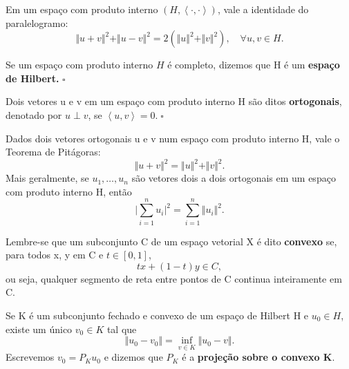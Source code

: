 \documentclass[../functional_analysis.tex]{subfiles}
\begin{document}
\hypertarget{parallelogram_identity}{\begin{lemma*}
		Em um espaço com produto interno \((H, \left< \cdot , \cdot  \right>)\), vale a identidade do paralelogramo:
		\[
			\Vert u + v \Vert^{2} + \Vert u-v \Vert^{2} = 2(\Vert u \Vert^{2} + \Vert v \Vert^{2}),\quad \forall u, v\in H.
		\]
	\end{lemma*}}
\begin{def*}
	Se um espaço com produto interno \(H\) é completo, dizemos que H é um \textbf{espaço de Hilbert.} \(\square\)
\end{def*}
\begin{def*}
	Dois vetores u e v em um espaço com produto interno H são ditos \textbf{ortogonais}, denotado por \(u\perp v\), se \(\left< u, v \right> = 0.\; \square\)
\end{def*}
\hypertarget{pythagorean_theorem}{\begin{theorem*}
		Dados dois vetores ortogonais u e v num espaço com produto interno H, vale o Teorema de Pitágoras:
		\[
			\Vert u + v \Vert^{2} = \Vert u \Vert^{2} + \Vert v \Vert^{2}.
		\]
		Mais geralmente, se \(u_1, \dotsc , u_{n}\) são vetores dois a dois ortogonais em um espaço com produto interno H, então
		\[
			\biggl\vert \sum\limits_{i=1}^{n}u_{i} \biggr\vert^{2} = \sum\limits_{i=1}^{n}\Vert u_{i} \Vert^{2}.
		\]
	\end{theorem*}}
\begin{tcolorbox}[
		skin=enhanced,
		title=Lembrete!,
		after title={\hfill Conjuntos Convexos},
		fonttitle=\bfseries,
		sharp corners=downhill,
		colframe=black,
		colbacktitle=yellow!75!white,
		colback=yellow!30,
		colbacklower=black,
		coltitle=black,
		drop large lifted shadow
	]
	Lembre-se que um subconjunto C de um espaço vetorial X é dito \textbf{convexo} se, para todos x, y em C e \(t\in [0, 1]\),
	\[
		tx + (1-t)y\in C,
	\]
	ou seja, qualquer segmento de reta entre pontos de C continua inteiramente em C.
\end{tcolorbox}

\begin{lemma*}
	Se K é um subconjunto fechado e convexo de um espaço de Hilbert H e \(u_{0}\in H\), existe um único \(v_{0}\in K\) tal que
	\[
		\Vert u_{0}-v_{0} \Vert = \inf_{v\in K}\Vert u_{0}-v \Vert.
	\]
	Escrevemos \(v_{0} = P_{K}u_{0}\) e dizemos que \(P_{K}\) é a \textbf{projeção sobre o convexo K}.
\end{lemma*}
\end{document}
